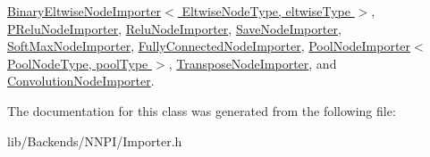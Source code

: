 \hyperlink{class_binary_eltwise_node_importer_a32d09983a182dbdfa8f826575459a081}{Binary\+Eltwise\+Node\+Importer$<$ Eltwise\+Node\+Type, eltwise\+Type $>$}, \hyperlink{class_p_relu_node_importer_a06ec6bb0a02dc220c9f2b6ccf1ca2f8e}{P\+Relu\+Node\+Importer}, \hyperlink{class_relu_node_importer_a32690710b7a4cf75df05d738ea0e278a}{Relu\+Node\+Importer}, \hyperlink{class_save_node_importer_aed61c7228a7764c207fdeadb66bd6ac5}{Save\+Node\+Importer}, \hyperlink{class_soft_max_node_importer_a9fb48b55dbe0a52f8cd8b6e0e9b55d4f}{Soft\+Max\+Node\+Importer}, \hyperlink{class_fully_connected_node_importer_a567fe17c8fb522be6ce33f49d4c202be}{Fully\+Connected\+Node\+Importer}, \hyperlink{class_pool_node_importer_a0c3544fc147b689ca5d3d6cc00cc26bf}{Pool\+Node\+Importer$<$ Pool\+Node\+Type, pool\+Type $>$}, \hyperlink{class_transpose_node_importer_a86f4ae6773a3898950e9e70d415aa861}{Transpose\+Node\+Importer}, and \hyperlink{class_convolution_node_importer_a3fb2af796bd7e7e002351ff2f98a83f4}{Convolution\+Node\+Importer}.



The documentation for this class was generated from the following file\+:\begin{DoxyCompactItemize}
\item 
lib/\+Backends/\+N\+N\+P\+I/Importer.\+h\end{DoxyCompactItemize}
